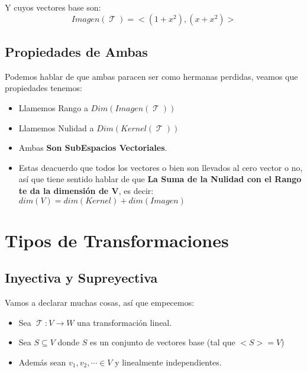 \documentclass[12pt]{report}                                    %
\DeclareMathOperator \LinealTransformation {\mathcal{T}}
\begin{document}
            Y cuyos vectores base son:
            \begin{equation*}
                Imagen(\LinealTransformation) = <(1+x^2) , (x+x^2)>
            \end{equation*}

    \clearpage
    \section{Propiedades de Ambas}
        Podemos hablar de que ambas paracen ser como hermanas perdidas,
        veamos que propiedades tenemos:

        \begin{itemize}
            \item Llamemos Rango a $Dim(Imagen(\LinealTransformation))$
            \item Llamemos Nulidad a $Dim(Kernel(\LinealTransformation))$
            \item Ambas \textbf{Son SubEspacios Vectoriales}.
            \item Estas deacuerdo que todos los vectores o bien son llevados al cero
            vector o no, así que tiene sentido hablar de que  \textbf{La Suma de la Nulidad
            con el Rango te da la dimensión de V}, es decir: $dim(V) = dim(Kernel)+dim(Imagen)$
        \end{itemize}


\chapter{Tipos de Transformaciones}

    \clearpage
    \section{Inyectiva y Supreyectiva}
        Vamos a declarar muchas cosas, así que empecemos:
        \begin{itemize}
            \item Sea $\LinealTransformation : V \to W $ una transformación lineal.
            \item Sea $S \subseteq V$ donde $S$ es un conjunto de vectores base (tal que $<S> = V$)
            \item Además sean $v_1, v_2, \cdots \in V$ y linealmente independientes.
        \end{itemize}
        
\end{document}
